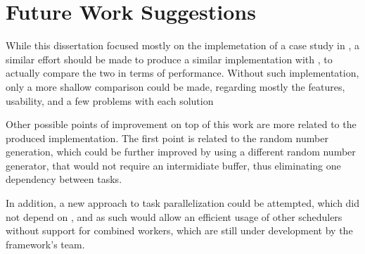 \documentclass[main.tex]{subfiles}
\begin{document}
\section{Future Work Suggestions}

While this dissertation focused mostly on the implemetation of a case study in \starpu, a similar effort should be made to produce a similar implementation with \gama, to actually compare the two in terms of performance. Without such implementation, only a more shallow comparison could be made, regarding mostly the features, usability, and a few problems with each solution

Other possible points of improvement on top of this work are more related to the produced implementation. The first point is related to the random number generation, which could be further improved by using a different random number generator, that would not require an intermidiate buffer, thus eliminating one dependency between tasks.

In addition, a new approach to task parallelization could be attempted, which did not depend on \openmp, and as such would allow an efficient usage of other \starpu schedulers without support for combined workers, which are still under development by the framework's team.
\end{document}
